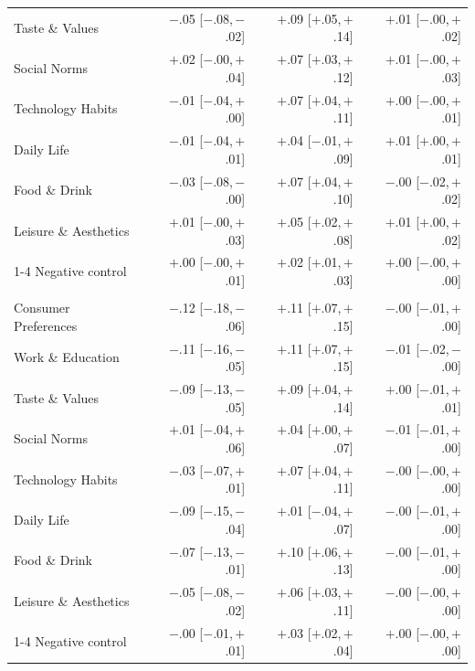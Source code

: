\begin{table}[h]
\begin{tabular}{l r r r}
Taste \& Values & $-$.05 \scriptsize{[$-$.08,\,$-$.02]} & $+$.09 \scriptsize{[$+$.05,\,$+$.14]} & $+$.01 \scriptsize{[$-$.00,\,$+$.02]} \\
Social Norms & $+$.02 \scriptsize{[$-$.00,\,$+$.04]} & $+$.07 \scriptsize{[$+$.03,\,$+$.12]} & $+$.01 \scriptsize{[$-$.00,\,$+$.03]} \\
Technology Habits & $-$.01 \scriptsize{[$-$.04,\,$+$.00]} & $+$.07 \scriptsize{[$+$.04,\,$+$.11]} & $+$.00 \scriptsize{[$-$.00,\,$+$.01]} \\
Daily Life & $-$.01 \scriptsize{[$-$.04,\,$+$.01]} & $+$.04 \scriptsize{[$-$.01,\,$+$.09]} & $+$.01 \scriptsize{[$+$.00,\,$+$.01]} \\
Food \& Drink & $-$.03 \scriptsize{[$-$.08,\,$-$.00]} & $+$.07 \scriptsize{[$+$.04,\,$+$.10]} & $-$.00 \scriptsize{[$-$.02,\,$+$.02]} \\
Leisure \& Aesthetics & $+$.01 \scriptsize{[$-$.00,\,$+$.03]} & $+$.05 \scriptsize{[$+$.02,\,$+$.08]} & $+$.01 \scriptsize{[$+$.00,\,$+$.02]} \\
\cmidrule(lr){1-4}
Negative control & $+$.00 \scriptsize{[$-$.00,\,$+$.01]} & $+$.02 \scriptsize{[$+$.01,\,$+$.03]} & $+$.00 \scriptsize{[$-$.00,\,$+$.00]} \\
\addlinespace
\multicolumn{4}{l}{\textit{Applied}} \\
Consumer Preferences & $-$.12 \scriptsize{[$-$.18,\,$-$.06]} & $+$.11 \scriptsize{[$+$.07,\,$+$.15]} & $-$.00 \scriptsize{[$-$.01,\,$+$.00]} \\
Work \& Education & $-$.11 \scriptsize{[$-$.16,\,$-$.05]} & $+$.11 \scriptsize{[$+$.07,\,$+$.15]} & $-$.01 \scriptsize{[$-$.02,\,$-$.00]} \\
Taste \& Values & $-$.09 \scriptsize{[$-$.13,\,$-$.05]} & $+$.09 \scriptsize{[$+$.04,\,$+$.14]} & $+$.00 \scriptsize{[$-$.01,\,$+$.01]} \\
Social Norms & $+$.01 \scriptsize{[$-$.04,\,$+$.06]} & $+$.04 \scriptsize{[$+$.00,\,$+$.07]} & $-$.01 \scriptsize{[$-$.01,\,$+$.00]} \\
Technology Habits & $-$.03 \scriptsize{[$-$.07,\,$+$.01]} & $+$.07 \scriptsize{[$+$.04,\,$+$.11]} & $-$.00 \scriptsize{[$-$.00,\,$+$.00]} \\
Daily Life & $-$.09 \scriptsize{[$-$.15,\,$-$.04]} & $+$.01 \scriptsize{[$-$.04,\,$+$.07]} & $-$.00 \scriptsize{[$-$.01,\,$+$.00]} \\
Food \& Drink & $-$.07 \scriptsize{[$-$.13,\,$-$.01]} & $+$.10 \scriptsize{[$+$.06,\,$+$.13]} & $-$.00 \scriptsize{[$-$.01,\,$+$.00]} \\
Leisure \& Aesthetics & $-$.05 \scriptsize{[$-$.08,\,$-$.02]} & $+$.06 \scriptsize{[$+$.03,\,$+$.11]} & $-$.00 \scriptsize{[$-$.00,\,$+$.00]} \\
\cmidrule(lr){1-4}
Negative control & $-$.00 \scriptsize{[$-$.01,\,$+$.01]} & $+$.03 \scriptsize{[$+$.02,\,$+$.04]} & $+$.00 \scriptsize{[$-$.00,\,$+$.00]} \\
\bottomrule
\end{tabular}
\end{table}
